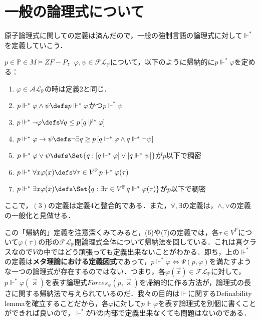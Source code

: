 \documentclass[a4j]{ltjsarticle}
\theoremstyle{definition}
\begin{document}
\section{一般の論理式について}
原子論理式に関しての定義は済んだので，一般の強制言語の論理式に対して$\mathrel{\Vdash^*}$ を定義していこう．

\begin{definition}\label{def:forces}
 $p \in \mathbb{P} \in M \models ZF - P$，$\varphi, \psi \in \mathcal{FL}_\mathbb{P}$について，以下のように帰納的に$p \mathrel{\Vdash^*} \varphi$を定める：
 \begin{enumerate}
  \item $\varphi \in \mathcal{AL}_\mathbb{P}$の時は定義2と同じ．
  \item $p \mathrel{\Vdash^*} \varphi \wedge \psi \defs p \mathrel{\Vdash^*} \varphi$かつ$p \mathrel{\Vdash^*} \psi$
  \item $p \mathrel{\Vdash^*} \neg \varphi \defs \forall q \leq p \,[ q \not \mathrel{\Vdash^*} \varphi]$\label{forces:neg-def}
  \item $p \mathrel{\Vdash^*} \varphi \rightarrow \psi \defs \neg \exists q \geq p \,[q \mathrel{\Vdash^*} \varphi \wedge q \mathrel{\Vdash^*} \neg \psi]$
  \item $p \mathrel{\Vdash^*} \varphi \vee \psi \defs \Set{ q : [q \mathrel{\Vdash^*} \varphi] \vee [q \mathrel{\Vdash^*} \psi]}$が$p$以下で稠密
  \item $p \mathrel{\Vdash^*} \forall x \varphi(x) \defs \forall \tau \in V^\mathbb{P} \, p \mathrel{\Vdash^*} \varphi(\tau)$
	\label{forces:universal}
  \item $p \mathrel{\Vdash^*} \exists x \varphi(x) \defs \Set{q : \exists \tau \in V^\mathbb{P} \, q \mathrel{\Vdash^*} \varphi(\tau)}$が$p$以下で稠密
	\label{forces:existential}
 \end{enumerate}
\end{definition}
ここで，$(3)$の定義は定義4と整合的である．また，$\forall, \exists$の定義は，$\wedge, \vee$の定義の一般化と見做せる．

この「帰納的」定義を注意深くみてみると，(6)や(7)の定義では，各$\tau \in V^\mathbb{P}$について$\varphi(\tau)$の形の$\mathcal{FL}_\mathbb{P}$閉論理式全体について帰納法を回している．これは真クラスなので$V$の中ではどう頑張っても定義出来ないことがわかる．即ち，上の$\mathrel{\Vdash^*}$の定義は\textbf{メタ理論における定義図式}であって，$p \mathrel{\Vdash^*} \varphi \Leftrightarrow \Psi(p, \varphi)$を満たすような一つの論理式が存在するのではない．つまり，各$\varphi(\vec{x}) \in \mathcal{FL}_\mathbb{P}$に対して，$p \mathrel{\Vdash^*} \varphi(\vec{\varkappa})$を表す論理式$Forces_\varphi(p, \vec{\varkappa})$を帰納的に作る方法が，論理式の長さに関する帰納法で与えられているのだ．我々の目的は$\Vdash$に関するDefinability lemmaを確立することだから，各$\varphi$に対して$p \Vdash \varphi$を表す論理式を別個に書くことができれば良いので，$\mathrel{\Vdash^*}$が$V$の内部で定義出来なくても問題はないのである．
\end{document}
